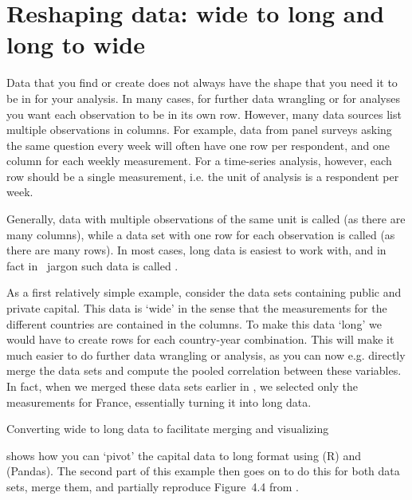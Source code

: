 \section{Reshaping data: wide to long and long to wide}\label{sec:pivot}

Data that you find or create does not always have the shape that you need it to be in for your analysis.
In many cases, for further data wrangling or for analyses you want each observation to be in its own row.
However, many data sources list multiple observations in columns.
For example, data from panel surveys asking the same question every week will often have one row per respondent,
and one column for each weekly measurement.
For a time-series analysis, however, each row should be a single measurement,
i.e. the unit of analysis is a respondent per week.

Generally, data with multiple observations of the same unit is called  (as there are many columns),
while a data set with one row for each observation is called  (as there are many rows).
In most cases, long data is easiest to work with, and in fact in \tidyverse\ jargon such data is called .

As a first relatively simple example, consider the data sets containing public and private capital.
This data is `wide' in the sense that the measurements for the different countries are contained in the columns.
To make this data `long' we would have to create rows for each country-year combination.
This will make it much easier to do further data wrangling or analysis, as you can now e.g. directly merge the data sets and compute the pooled correlation between these variables. 
In fact, when we merged these data sets earlier in , we selected only the measurements for France, essentially turning it into long data.

\begin{ccsexample}
  \begin{tcolorbox}[title=Output]
    \texttt{[image: \{snippets/chapter07/merge2.r]}.png}
  \end{tcolorbox}
  \caption{Converting wide to long data to facilitate merging and visualizing}\label{ex:merge}
\end{ccsexample}

 shows how you can `pivot' the capital data to long format using  (R) and  (Pandas). The second part of this example then goes on to do this for both data sets, merge them, and partially reproduce Figure~4.4 from \citet{piketty}.

